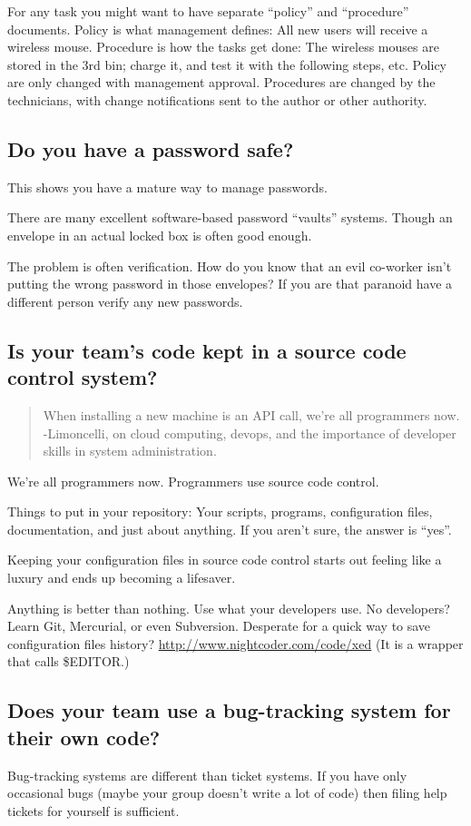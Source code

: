 \documentclass{article}
\begin{document}
For any task you might want to have separate ``policy'' and ``procedure'' documents. Policy is what management defines: All new users will receive a wireless mouse. Procedure is how the tasks get done: The wireless mouses are stored in the 3rd bin; charge it, and test it with the following steps, etc. Policy are only changed with management approval. Procedures are changed by the technicians, with change notifications sent to the author or other authority.

\subsection{Do you have a password safe?}
This shows you have a mature way to manage passwords.

There are many excellent software-based password ``vaults'' systems. Though an envelope in an actual locked box is often good enough.

The problem is often verification. How do you know that an evil co-worker isn't putting the wrong password in those envelopes? If you are that paranoid have a different person verify any new passwords.

\subsection{Is your team's code kept in a source code control system?}
\begin{quote}
When installing a new machine is an API call, we're all programmers now. -Limoncelli, on cloud computing, devops, and the importance of developer skills in system administration.
\end{quote}

We're all programmers now. Programmers use source code control.

Things to put in your repository: Your scripts, programs, configuration files, documentation, and just about anything. If you aren't sure, the answer is ``yes''.

Keeping your configuration files in source code control starts out feeling like a luxury and ends up becoming a lifesaver.

Anything is better than nothing. Use what your developers use. No developers? Learn Git, Mercurial, or even Subversion. Desperate for a quick way to save configuration files history? \url{http://www.nightcoder.com/code/xed} (It is a wrapper that calls \$EDITOR.)

\subsection{Does your team use a bug-tracking system for their own code?}
Bug-tracking systems are different than ticket systems. If you have only occasional bugs (maybe your group doesn't write a lot of code) then filing help tickets for yourself is sufficient.
\end{document}
